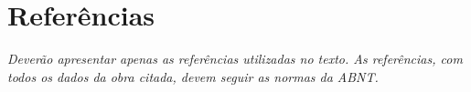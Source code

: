 \section{Referências}

\textit{Deverão apresentar apenas as referências utilizadas no texto. As referências, com todos os dados da obra citada, devem seguir as normas da ABNT.}
